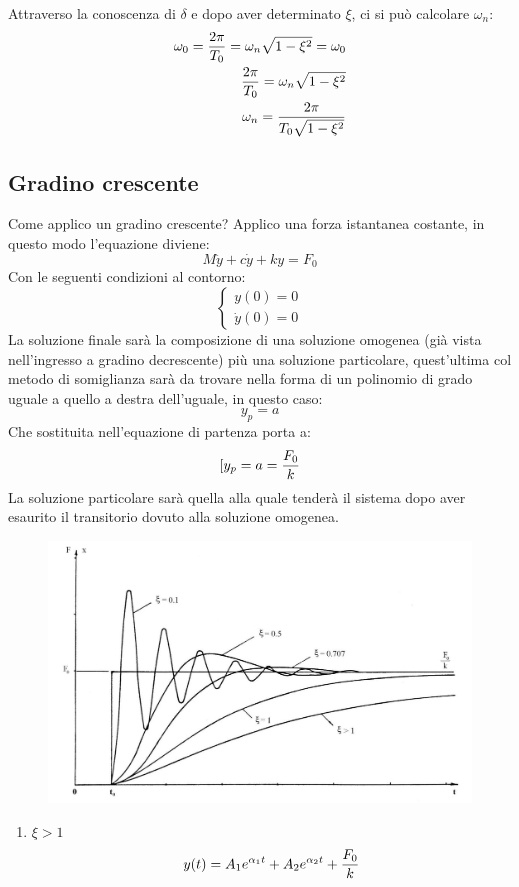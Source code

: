 \documentclass[a4paper, 15pt]{article}
\begin{document}
\begin{adjustwidth}{2in}{}
	Attraverso la conoscenza di $\delta$ e dopo aver determinato $\xi$, ci si può calcolare $\omega_n$: 
	\begin{eqnarray*}
		\omega_0 = {2\pi\over T_0} = \omega_n\sqrt{1 - \xi^2} = \omega_0  \\
		{2\pi\over T_0} = \omega_n\sqrt{1 - \xi^2}  \\
		\omega_n = {2\pi\over T_0\sqrt{1 - \xi^2}}
	\end{eqnarray*} 
\end{adjustwidth}
\subsection{Gradino crescente} 	
\begin{adjustwidth}{2in}{}	
	Come applico un gradino crescente? Applico una forza istantanea costante, in questo modo l'equazione diviene: 
	\[ M\ddot{y} + c\dot{y} + ky =F_0\]
	Con le seguenti condizioni al contorno:
	\[ \begin{cases}
		y(0) = 0 \\
		\dot{y}(0) = 0
	\end{cases}\]
	La soluzione finale sarà la composizione di una soluzione omogenea (già vista nell'ingresso a gradino decrescente) più una soluzione particolare, quest'ultima col metodo di somiglianza sarà da trovare nella forma di un polinomio di grado uguale a quello a destra dell'uguale, in questo caso: 
	\[y_p = a\]
	Che sostituita nell'equazione di partenza porta a:
	\[[y_p = a = {F_0\over k}\]
	La soluzione particolare sarà quella alla quale tenderà il sistema dopo aver esaurito il transitorio dovuto alla soluzione omogenea. 	
	\begin{figure}[H]
		\centering
		\includegraphics[width=0.7\linewidth]{fig/imag5}
		\label{fig:imag5}
	\end{figure}
	\begin{enumerate}[label=\Roman*.]
	\item \( \xi > 1\) 
	 \[y(t) = A_1e^{\alpha_1 t} + A_2e^{\alpha_2 t} + {F_0\over k} \]

\end{enumerate}
\end{adjustwidth}
\end{document}
